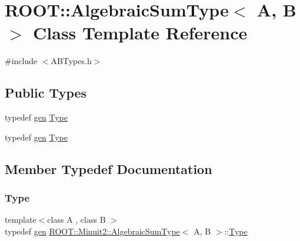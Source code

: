 \hypertarget{classROOT_1_1Minuit2_1_1AlgebraicSumType}{}\section{R\+O\+OT\+:\+:Algebraic\+Sum\+Type$<$ A, B $>$ Class Template Reference}
\label{classROOT_1_1Minuit2_1_1AlgebraicSumType}


{\ttfamily \#include $<$A\+B\+Types.\+h$>$}

\subsection*{Public Types}
\begin{DoxyCompactItemize}
\item 
typedef \mbox{\hyperlink{classROOT_1_1Minuit2_1_1gen}{gen}} \mbox{\hyperlink{classROOT_1_1Minuit2_1_1AlgebraicSumType_a9bf43a13ee66f334fb43c489c5bfa2e5}{Type}}
\item 
typedef \mbox{\hyperlink{classROOT_1_1Minuit2_1_1gen}{gen}} \mbox{\hyperlink{classROOT_1_1Minuit2_1_1AlgebraicSumType_a9bf43a13ee66f334fb43c489c5bfa2e5}{Type}}
\end{DoxyCompactItemize}


\subsection{Member Typedef Documentation}
\mbox{\label{classROOT_1_1Minuit2_1_1AlgebraicSumType_a9bf43a13ee66f334fb43c489c5bfa2e5}} 
\subsubsection{\texorpdfstring{Type}{Type}\hspace{0.1cm}{\footnotesize\ttfamily [1/2]}}
{\footnotesize\ttfamily template$<$class A , class B $>$ \\
typedef \mbox{\hyperlink{classROOT_1_1Minuit2_1_1gen}{gen}} \mbox{\hyperlink{classROOT_1_1Minuit2_1_1AlgebraicSumType}{R\+O\+O\+T\+::\+Minuit2\+::\+Algebraic\+Sum\+Type}}$<$ A, B $>$\+::\mbox{\hyperlink{classROOT_1_1Minuit2_1_1AlgebraicSumType_a9bf43a13ee66f334fb43c489c5bfa2e5}{Type}}}

